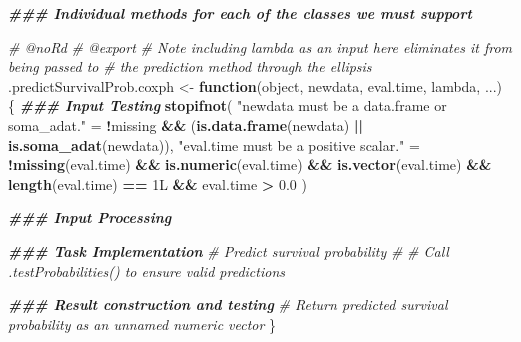 \documentclass[
]{book}
\newenvironment{Shaded}{\begin{snugshade}}{\end{snugshade}}
\newcommand{\CommentTok}[1]{\textcolor[rgb]{0.56,0.35,0.01}{\textit{#1}}}
\newcommand{\ControlFlowTok}[1]{\textcolor[rgb]{0.13,0.29,0.53}{\textbf{#1}}}
\newcommand{\DocumentationTok}[1]{\textcolor[rgb]{0.56,0.35,0.01}{\textbf{\textit{#1}}}}
\newcommand{\FloatTok}[1]{\textcolor[rgb]{0.00,0.00,0.81}{#1}}
\newcommand{\FunctionTok}[1]{\textcolor[rgb]{0.13,0.29,0.53}{\textbf{#1}}}
\newcommand{\NormalTok}[1]{#1}
\newcommand{\OtherTok}[1]{\textcolor[rgb]{0.56,0.35,0.01}{#1}}
\newcommand{\SpecialCharTok}[1]{\textcolor[rgb]{0.81,0.36,0.00}{\textbf{#1}}}
\newcommand{\StringTok}[1]{\textcolor[rgb]{0.31,0.60,0.02}{#1}}
\begin{document}
\begin{Shaded}
\begin{Highlighting}[]
\DocumentationTok{\#\#\# Individual methods for each of the classes we must support}

\CommentTok{\#\textquotesingle{} @noRd}
\CommentTok{\#\textquotesingle{} @export}
\CommentTok{\#\textquotesingle{} Note including lambda as an input here eliminates it from being passed to}
\CommentTok{\#\textquotesingle{}   the prediction method through the ellipsis}
\NormalTok{.predictSurvivalProb.coxph }\OtherTok{\textless{}{-}} \ControlFlowTok{function}\NormalTok{(object, newdata, eval.time, lambda, ...) \{}
  \DocumentationTok{\#\#\# Input Testing}
  \FunctionTok{stopifnot}\NormalTok{(}
    \StringTok{"\textasciigrave{}newdata\textasciigrave{} must be a data.frame or soma\_adat."} \OtherTok{=} 
      \SpecialCharTok{!}\NormalTok{missing }\SpecialCharTok{\&\&}\NormalTok{ (}\FunctionTok{is.data.frame}\NormalTok{(newdata) }\SpecialCharTok{||} \FunctionTok{is.soma\_adat}\NormalTok{(newdata)),}
    \StringTok{"\textasciigrave{}eval.time\textasciigrave{} must be a positive scalar."} \OtherTok{=} 
      \SpecialCharTok{!}\FunctionTok{missing}\NormalTok{(eval.time) }\SpecialCharTok{\&\&} \FunctionTok{is.numeric}\NormalTok{(eval.time) }\SpecialCharTok{\&\&} 
        \FunctionTok{is.vector}\NormalTok{(eval.time) }\SpecialCharTok{\&\&} \FunctionTok{length}\NormalTok{(eval.time) }\SpecialCharTok{==}\NormalTok{ 1L }\SpecialCharTok{\&\&}\NormalTok{ eval.time }\SpecialCharTok{\textgreater{}} \FloatTok{0.0}
\NormalTok{  )}
  
  \DocumentationTok{\#\#\# Input Processing}
  
  \DocumentationTok{\#\#\# Task Implementation}
  \CommentTok{\# Predict survival probability}
  \CommentTok{\#}
  \CommentTok{\# Call .testProbabilities() to ensure valid predictions}
  
  \DocumentationTok{\#\#\# Result construction and testing}
  \CommentTok{\# Return predicted survival probability as an unnamed numeric vector}
\NormalTok{\}}


\end{Highlighting}
\end{Shaded}
\end{document}
